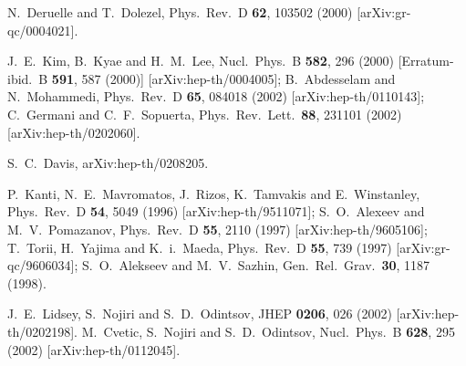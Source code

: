 \documentclass[a4paper,a4paper]{article}
\begin{document}
\begin{thebibliography}{99}
N.~Deruelle and T.~Dolezel,
Phys.\ Rev.\ D {\bf 62}, 103502 (2000)
[arXiv:gr-qc/0004021].


J.~E.~Kim, B.~Kyae and H.~M.~Lee,
Nucl.\ Phys.\ B {\bf 582}, 296 (2000)
[Erratum-ibid.\ B {\bf 591}, 587 (2000)]
[arXiv:hep-th/0004005];
B.~Abdesselam and N.~Mohammedi,
Phys.\ Rev.\ D {\bf 65}, 084018 (2002)
[arXiv:hep-th/0110143];
C.~Germani and C.~F.~Sopuerta,
Phys.\ Rev.\ Lett.\  {\bf 88}, 231101 (2002)
[arXiv:hep-th/0202060].



S.~C.~Davis,
arXiv:hep-th/0208205.



P.~Kanti, N.~E.~Mavromatos, J.~Rizos, K.~Tamvakis and E.~Winstanley,
Phys.\ Rev.\ D {\bf 54}, 5049 (1996)
[arXiv:hep-th/9511071];
S.~O.~Alexeev and M.~V.~Pomazanov,
Phys.\ Rev.\ D {\bf 55}, 2110 (1997)
[arXiv:hep-th/9605106];
T.~Torii, H.~Yajima and K.~i.~Maeda,
Phys.\ Rev.\ D {\bf 55}, 739 (1997)
[arXiv:gr-qc/9606034];
S.~O.~Alekseev and M.~V.~Sazhin,
Gen.\ Rel.\ Grav.\  {\bf 30}, 1187 (1998).


J.~E.~Lidsey, S.~Nojiri and S.~D.~Odintsov,
JHEP {\bf 0206}, 026 (2002)
[arXiv:hep-th/0202198].
M.~Cvetic, S.~Nojiri and S.~D.~Odintsov,
Nucl.\ Phys.\ B {\bf 628}, 295 (2002)
[arXiv:hep-th/0112045].



\end{thebibliography} 
\end{document}
